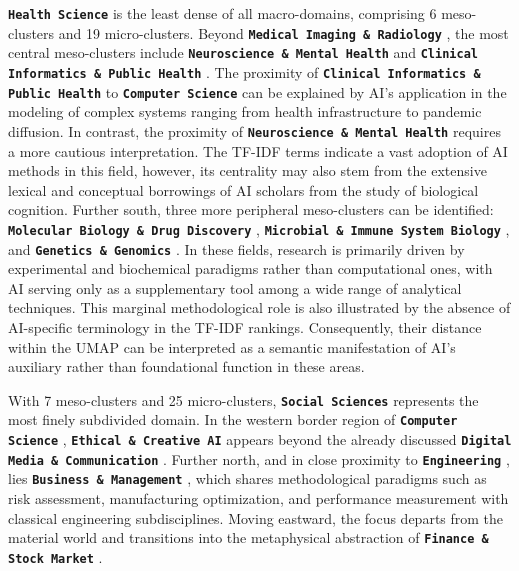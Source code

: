 \documentclass{article}
\begin{document}
	\textbf{\texttt{Health Science}}  is the least dense of all macro-domains, comprising 6 meso-clusters and 19 micro-clusters. Beyond \textbf{\texttt{Medical Imaging \& Radiology}} , the most central meso-clusters include \textbf{\texttt{Neuroscience \& Mental Health}}  and \textbf{\texttt{Clinical Informatics \& Public Health}} . The proximity of \textbf{\texttt{Clinical Informatics \& Public Health}}  to \textbf{\texttt{Computer Science}}  can be explained by AI’s application in the modeling of complex systems ranging from health infrastructure to pandemic diffusion. In contrast, the proximity of \textbf{\texttt{Neuroscience \& Mental Health}}  requires a more cautious interpretation. The TF-IDF terms indicate a vast adoption of AI methods in this field, however, its centrality may also stem from the extensive lexical and conceptual borrowings of AI scholars from the study of biological cognition. Further south, three more peripheral meso-clusters can be identified: \textbf{\texttt{Molecular Biology \& Drug Discovery}} , \textbf{\texttt{Microbial \& Immune System Biology}} , and \textbf{\texttt{Genetics \& Genomics}} . In these fields, research is primarily driven by experimental and biochemical paradigms rather than computational ones, with AI serving only as a supplementary tool among a wide range of analytical techniques. This marginal methodological role is also illustrated by the absence of AI-specific terminology in the TF-IDF rankings. Consequently, their distance within the UMAP can be interpreted as a semantic manifestation of AI’s auxiliary rather than foundational function in these areas.
	
	With 7 meso-clusters and 25 micro-clusters, \textbf{\texttt{Social Sciences}}  represents the most finely subdivided domain. In the western border region of \textbf{\texttt{Computer Science}} , \textbf{\texttt{Ethical \& Creative AI}}  appears beyond the already discussed \textbf{\texttt{Digital Media \& Communication}} . Further north, and in close proximity to  \textbf{\texttt{Engineering}} , lies \textbf{\texttt{Business \& Management}} , which shares methodological paradigms such as risk assessment, manufacturing optimization, and performance measurement with classical engineering subdisciplines. Moving eastward, the focus departs from the material world and transitions into the metaphysical abstraction of \textbf{\texttt{Finance \& Stock Market}} .
	
\end{document}
